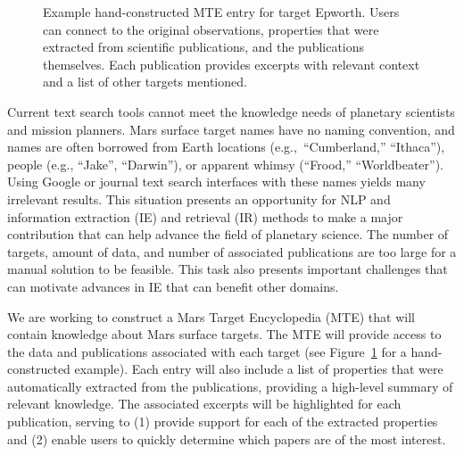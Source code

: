 \documentclass[letterpaper]{article}
\begin{document}
\begin{figure}
\centerline{}
\caption{Example hand-constructed MTE entry for target
Epworth. Users can connect to the original observations, properties
that were extracted from scientific publications, and the publications
themselves.  Each publication provides excerpts with relevant context
and a list of other targets mentioned.}
\label{fig:epworth}
\end{figure}

Current text search tools cannot meet the knowledge needs of planetary
scientists and mission planners.  Mars surface target names have no
naming convention, and names are often borrowed from Earth locations
(e.g.,~``Cumberland,'' ``Ithaca''), people (e.g., ``Jake'',
``Darwin''), or apparent whimsy (``Frood,'' ``Worldbeater'').  Using
Google or journal text search interfaces with these names yields many
irrelevant results.
This situation presents an opportunity for NLP and information
extraction (IE) and retrieval (IR) methods to make a major
contribution that can help advance the field of planetary science.
The number of targets, amount of data, and number of associated
publications are too large for a manual solution to be feasible. This
task also presents important challenges that can motivate advances in
IE that can benefit other domains.

We are working to construct a Mars Target Encyclopedia (MTE) that will
contain knowledge about Mars surface targets.  The MTE will provide
access to the data and publications associated with each target (see
Figure~\ref{fig:epworth} for a hand-constructed example).  Each entry
will also include a list of properties that were automatically
extracted from the publications, providing a high-level summary of
relevant knowledge.  The associated excerpts will be highlighted for
each publication, serving to (1) provide support for each of the
extracted properties and (2) enable users to quickly determine which
papers are of the most interest.  
\end{document}
